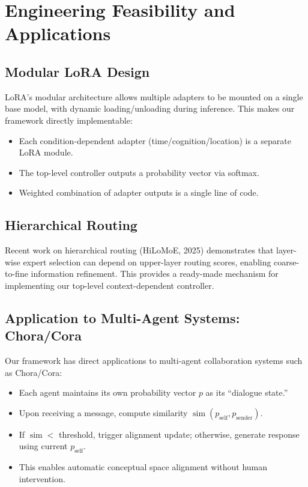 \documentclass[11pt, a4paper]{article}
\begin{document}
\section{Engineering Feasibility and Applications}

\subsection{Modular LoRA Design}
LoRA's modular architecture allows multiple adapters to be mounted on a single base model, with dynamic loading/unloading during inference. This makes our framework directly implementable:
\begin{itemize}
  \item Each condition-dependent adapter (time/cognition/location) is a separate LoRA module.
  \item The top-level controller outputs a probability vector via softmax.
  \item Weighted combination of adapter outputs is a single line of code.
\end{itemize}

\subsection{Hierarchical Routing}
Recent work on hierarchical routing (HiLoMoE, 2025) demonstrates that layer-wise expert selection can depend on upper-layer routing scores, enabling coarse-to-fine information refinement. This provides a ready-made mechanism for implementing our top-level context-dependent controller.

\subsection{Application to Multi-Agent Systems: Chora/Cora}
Our framework has direct applications to multi-agent collaboration systems such as Chora/Cora:
\begin{itemize}
  \item Each agent maintains its own probability vector $p$ as its ``dialogue state.''
  \item Upon receiving a message, compute similarity $\operatorname{sim}(p_{\text{self}}, p_{\text{sender}})$.
  \item If $\operatorname{sim} < $ threshold, trigger alignment update; otherwise, generate response using current $p_{\text{self}}$.
  \item This enables automatic conceptual space alignment without human intervention.
\end{itemize}
\end{document}
